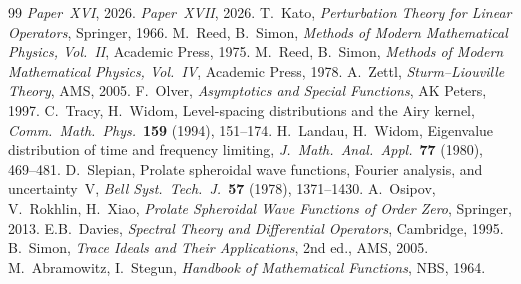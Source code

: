 \documentclass[12pt,a4paper]{amsart}
\theoremstyle{definition}
\begin{document}
\begin{thebibliography}{99}
 \textit{Paper~XVI}, 2026.
 \textit{Paper~XVII}, 2026.
 T.~Kato,
  \textit{Perturbation Theory for Linear Operators}, Springer, 1966.
 M.~Reed, B.~Simon,
  \textit{Methods of Modern Mathematical Physics, Vol.~II},
  Academic Press, 1975.
 M.~Reed, B.~Simon,
  \textit{Methods of Modern Mathematical Physics, Vol.~IV},
  Academic Press, 1978.
 A.~Zettl,
  \textit{Sturm--Liouville Theory}, AMS, 2005.
 F.~Olver,
  \textit{Asymptotics and Special Functions}, AK Peters, 1997.
 C.~Tracy, H.~Widom,
  Level-spacing distributions and the Airy kernel,
  \textit{Comm.\ Math.\ Phys.}\ \textbf{159} (1994), 151--174.
 H.~Landau, H.~Widom,
  Eigenvalue distribution of time and frequency limiting,
  \textit{J.\ Math.\ Anal.\ Appl.}\ \textbf{77} (1980), 469--481.
 D.~Slepian,
  Prolate spheroidal wave functions, Fourier analysis, and
  uncertainty~V,
  \textit{Bell Syst.\ Tech.\ J.}\ \textbf{57} (1978), 1371--1430.
 A.~Osipov, V.~Rokhlin, H.~Xiao,
  \textit{Prolate Spheroidal Wave Functions of Order Zero},
  Springer, 2013.
 E.B.~Davies,
  \textit{Spectral Theory and Differential Operators},
  Cambridge, 1995.
 B.~Simon,
  \textit{Trace Ideals and Their Applications}, 2nd ed., AMS, 2005.
 M.~Abramowitz, I.~Stegun,
  \textit{Handbook of Mathematical Functions}, NBS, 1964.
\end{thebibliography}
\end{document}
